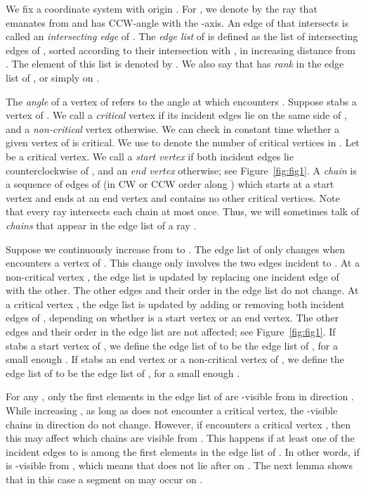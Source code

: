 \documentclass[11pt, a4paper]{article}
\begin{document}
We fix a coordinate system with origin .
For , we denote by  the ray 
that emanates from  and has CCW-angle  with the 
-axis. An edge of  that intersects  is called 
an \emph{intersecting edge} of . The \emph{edge list} 
of  is defined as the list of intersecting edges of 
, sorted according to their intersection with ,
in increasing distance from . The  element of this 
list is denoted by . We also say that  has
\emph{rank}  in the edge list of , or simply on .

The \emph{angle} of a vertex  of 
refers to the angle  at which 
 encounters . Suppose  stabs a vertex  of .
We call  a \emph{critical}
vertex if its incident edges lie on the same side of , and
a \emph{non-critical} vertex otherwise. 
We can check in constant time whether a given vertex of  is 
critical. We use  to denote the number of 
critical vertices in . Let  be a critical 
vertex. We call  a 
\emph{start vertex} if both incident edges lie counterclockwise
of , and an \emph{end vertex} otherwise; see 
Figure~\ref{fig:fig1}.
A \emph{chain} is a sequence of edges of  
(in CW or CCW order along ) which starts at a start vertex
and ends at an end vertex and contains no other
critical vertices. Note that every ray  
intersects each chain at most once. Thus, we will sometimes
talk of \emph{chains} that appear in the edge list of 
a ray .

Suppose we continuously increase  from  to .
The edge list of  only changes when  
encounters a vertex  of . This change only involves 
the two edges incident to .
At a non-critical vertex , the edge list is updated by
replacing one incident edge of  with the other. The other edges and
their order in the edge list do not change.
At a critical vertex , the edge list is updated by
adding or removing both incident edges of , depending
on whether  is a start vertex or an end vertex. The other edges 
and their order in the edge list are not affected; see 
Figure~\ref{fig:fig1}. 
If  stabs a start vertex of , we define the edge list 
of  to be the edge list of , for a 
small enough . 
If  stabs an end vertex or a non-critical vertex of , 
we define the edge list 
of  to be the edge list of , for a 
small enough .

For any ,
only the first  elements 
in the edge list of  are -visible from  in
direction . While increasing , as
long as  does not encounter a 
critical vertex, the -visible chains in direction  do not change.
However, if  encounters a critical vertex , then 
this may affect which chains are visible from .
This happens if at least one of the incident edges to  is among the 
first  elements in the edge list of . 
In other words, if  is -visible from , which means that  
does not lie after  on . 
The next lemma shows that in this case a segment on  may 
occur on . 
\end{document}
